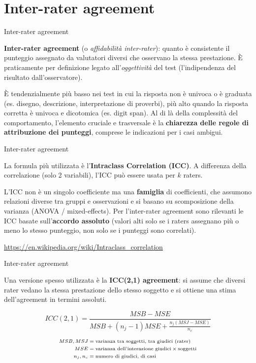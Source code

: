 \documentclass[
  ignorenonframetext,
  aspectratio=169,
]{beamer}
\begin{document}
\section{Inter-rater agreement}\label{inter-rater-agreement}

\begin{frame}{Inter-rater agreement}
\label{inter-rater-agreement-1}
\small

\textbf{Inter-rater agreement} (o \emph{affidabilità inter-rater}):
quanto è consistente il punteggio assegnato da valutatori diversi che
osservano la stessa prestazione. È praticamente per definizione legato
all'\emph{oggettività} del test (l'indipendenza del risultato
dall'osservatore).

È tendenzialmente più basso nei test in cui la risposta non è univoca o
è graduata (es. disegno, descrizione, interpretazione di proverbi), più
alto quando la risposta corretta è univoca e dicotomica (es. digit
span). Al di là della complessità del comportamento, l'elemento cruciale
e trasversale è la \textbf{chiarezza delle regole di attribuzione dei
punteggi}, comprese le indicazioni per i casi ambigui.
\end{frame}

\begin{frame}{Inter-rater agreement}
\label{inter-rater-agreement-2}
\small

La formula più utilizzata è l'\textbf{Intraclass Correlation (ICC)}. A
differenza della correlazione (solo 2 variabili), l'ICC può essere usata
per \(k\) raters.

L'ICC non è un singolo coefficiente ma una \textbf{famiglia} di
coefficienti, che assumono relazioni diverse tra gruppi e osservazioni e
si basano su scomposizione della varianza (ANOVA / mixed-effects). Per
l'inter-rater agreement sono rilevanti le ICC basate
sull'\textbf{accordo assoluto} (valori alti solo se i raters assegnano
più o meno lo stesso punteggio, non solo se i punteggi sono correlati).

\href{https://en.wikipedia.org/wiki/Intraclass_correlation}{\ul{https://en.wikipedia.org/wiki/Intraclass\_correlation}}
\end{frame}

\begin{frame}{Inter-rater agreement}
\label{inter-rater-agreement-3}
\small

Una versione spesso utilizzata è la \textbf{ICC(2,1) agreement}: si
assume che diversi rater vedano la stessa prestazione dello stesso
soggetto e si ottiene una stima dell'agreement in termini assoluti.

\[
ICC(2,1) = \frac{MSB - MSE}
{MSB + (n_j - 1)MSE + \frac{n_j(MSJ - MSE)}{n_c}}
\]

\[
\scriptsize
\begin{aligned}
MSB, MSJ & = \text{varianza tra soggetti, tra giudici (rater)} \\
MSE & = \text{varianza dell'interazione giudici} \times \text{soggetti} \\
n_j, n_c & = \text{numero di giudici, di casi}
\end{aligned}
\]
\end{frame}
\end{document}
